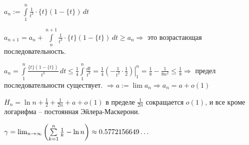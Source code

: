 \begin{example}
\begin{enumerate}
    $a_n := \int\limits_{1}^{n} \frac{1}{t^3} \cdot \{t\}(1 - \{t\})\, dt$
    
    $a_{n+1} = a_n + \int\limits_{n}^{n+1} \frac{1}{t^3} \cdot \{t\}(1 - \{t\})\, dt \geqslant a_n \Rightarrow $ это возрастающая последовательность. 
    
    $a_n = \int\limits_{1}^{n} \frac{\{t\}(1 - \{t\})}{t^3} \, dt \leqslant \frac{1}{4} \int\limits_{1}^{n} \frac{dt}{t^3} = \left.\frac{1}{4} \left( -\frac{1}{t^2} \cdot \frac{1}{2} \right) \right|_1^n = \frac{1}{8} - \frac{1}{8n^2} \leqslant \frac{1}{8} \Rightarrow$ предел последовательности существует. $\Rightarrow a:= \lim a_n \Rightarrow a_n = a + o(1)$
    
    $H_n = \ln n + \frac{1}{2} + \frac{1}{2n} + a + o(1)$ в пределе $\frac{1}{2n}$ сокращается $o(1)$, и все кроме логарифма -- постоянная Эйлера-Маскерони.
    
    $\gamma = \lim_{n\to\infty} \left( \sum\limits_{k=1}^{n}{1\over k} - \ln n \right) \approx 0.5772156649\ldots$
    
\end{enumerate}
\end{example}